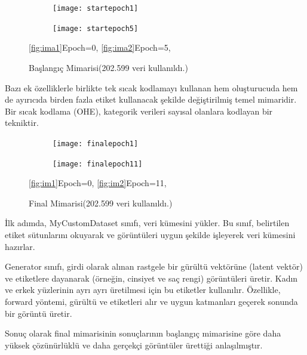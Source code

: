 \documentclass[12pt, a4paper]{article}
\begin{document}
	\begin{figure}[htbp]
		\centering
		\begin{subfigure}{0.48\textwidth}
			\centering
			\texttt{[image: startepoch1]}
			\caption{}
			\label{fig:ima1}
		\end{subfigure}
		\hfill
		\begin{subfigure}{0.48\textwidth}
			\centering
			\texttt{[image: startepoch5]}
			\caption{}
			\label{fig:ima2}
		\end{subfigure}
		\caption{Başlangıç Mimarisi(202.599 veri kullanıldı.)\cite{fu2022styleganhuman}}
		\label{fig:siix_images}
		\eqref{fig:ima1}Epoch=0,
		\eqref{fig:ima2}Epoch=5,
	\end{figure}
	\FloatBarrier
	\clearpage
	Bazı ek özelliklerle birlikte tek sıcak kodlamayı kullanan hem oluşturucuda hem de ayırıcıda birden fazla etiket kullanacak şekilde değiştirilmiş temel mimaridir. 
	Bir sıcak kodlama (OHE), kategorik verileri sayısal olanlara kodlayan bir tekniktir\cite{Tek-2024-05-14}.
	
	\begin{figure}[htbp]
		\centering
		\begin{subfigure}{0.38\textwidth}
			\centering
			\texttt{[image: finalepoch1]}
			\caption{}
			\label{fig:im1}
		\end{subfigure}
		\hfill
		\begin{subfigure}{0.38\textwidth}
			\centering
			\texttt{[image: finalepoch11]}
			\caption{}
			\label{fig:im2}
		\end{subfigure}
		\caption{Final Mimarisi(202.599 veri kullanıldı.)\cite{fu2022styleganhuman}}
		\label{fig:six_images}
		\eqref{fig:im1}Epoch=0,
		\eqref{fig:im2}Epoch=11,
	\end{figure}
	\FloatBarrier
	İlk adımda, MyCustomDataset sınıfı, veri kümesini yükler. Bu sınıf, belirtilen etiket sütunlarını okuyarak ve görüntüleri uygun şekilde işleyerek veri kümesini hazırlar.
	
	Generator sınıfı, girdi olarak alınan rastgele bir gürültü vektörüne (latent vektör) ve etiketlere dayanarak (örneğin, cinsiyet ve saç rengi) görüntüleri üretir. Kadın ve erkek yüzlerinin ayrı ayrı üretilmesi için bu etiketler kullanılır. Özellikle, forward yöntemi, gürültü ve etiketleri alır ve uygun katmanları geçerek sonunda bir görüntü üretir.
	
	Sonuç olarak final mimarisinin sonuçlarının başlangıç mimarisine göre daha yüksek çözünürlüklü ve daha gerçekçi görüntüler ürettiği anlaşılmıştır.
	
\end{document}
